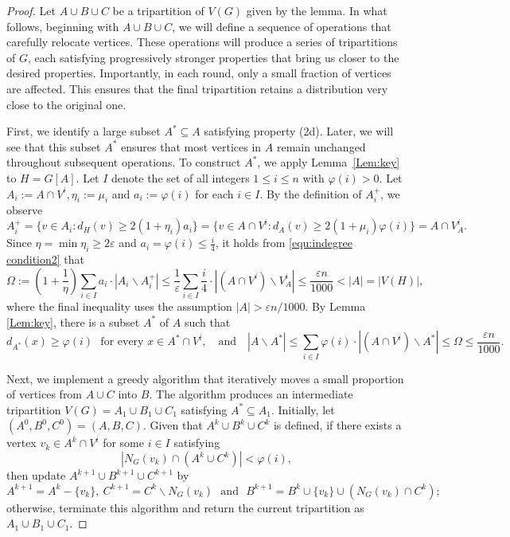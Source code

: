 \documentclass[10pt,a4paper]{amsart}
\begin{document}
	\begin{proof}
		Let $A\cup B\cup C$ be a tripartition of $V(G)$ given by the lemma.
		In what follows, beginning with $A\cup B\cup C$, we will define a sequence of operations that carefully relocate vertices.
		These operations will produce a series of tripartitions of $G$,
		each satisfying progressively stronger properties that bring us closer to the desired properties.
		Importantly, in each round, only a small fraction of vertices are affected.
		This ensures that the final tripartition retains a distribution very close to the original one.
		
		\medskip
		
		First, we identify a large subset $A^* \subseteq A$ satisfying property (2d).
		Later, we will see that this subset $A^*$ ensures that most vertices in $A$ remain unchanged throughout subsequent operations.
		To construct $A^*$, we apply Lemma~\ref{Lem:key} to $H=G[A]$.
		Let $I$ denote the set of all integers $1\leq i\leq n$ with $\varphi(i)>0$.
		Let $A_i:=A\cap V^i, \eta_i:=\mu_i$ and $a_i:=\varphi(i)$ for each $i\in I$.
		By the definition of $A_i^+$,
		we observe $$A_i^+ =\{v \in A_i : d_H(v) \geq 2(1+\eta_i)a_i\}=\{v\in A\cap V^i: d_A(v)\geq 2(1+\mu_i)\varphi(i)\}= A\cap V_A^i.$$
		Since $\eta=\min \eta_i\geq 2\varepsilon$ and $a_i=\varphi(i)\leq \frac{i}{4}$,
		it holds from \eqref{equ:indegree condition2} that
		$$\Omega:=(1+\frac{1}{\eta}) \sum_{i\in I} a_i \cdot|A_i\backslash A^+_i|\leq
		\frac{1}{\varepsilon} \sum_{i\in I} \frac{i}{4}\cdot |(A\cap V^i)\backslash V^i_A|\leq \frac{\varepsilon n}{1000}<|A|=|V(H)|,$$
		where the final inequality uses the assumption $|A|>\varepsilon n/1000$.
		By Lemma \ref{Lem:key}, there is a subset $A^*$ of $A$ such that
		\begin{equation}\label{equ:indeg deg(A*)}
			d_{A^*}(x)\ge \varphi(i) \text{~~for every } x\in A^*\cap V^i,
			\mbox{~~~and~~~}
			|A\backslash A^*|\le \sum_{i\in I} \varphi(i)\cdot |(A\cap V^i)\backslash A^*|\le \Omega\le \frac{\varepsilon n}{1000}.
		\end{equation}
		
		
		\medskip
		
		Next, we implement a greedy algorithm that iteratively moves a small proportion of vertices from $A \cup C$ into $B$.
		The algorithm produces an intermediate tripartition $V(G) = A_1 \cup B_1 \cup C_1$ satisfying $A^* \subseteq A_1$.
		Initially, let $(A^{0}, B^{0}, C^{0}) = (A, B, C)$.
		Given that $A^{k}\cup B^{k}\cup C^{k}$ is defined,
		if there exists a vertex $v_k\in A^{k}\cap V^i$ for some $i\in I$ satisfying
		\begin{equation}
			\label{equ:indeg alg}
			|N_G(v_k)\cap (A^{k}\cup C^{k})|<\varphi(i),
		\end{equation}
		then update $A^{k+1}\cup B^{k+1}\cup C^{k+1}$ by
		$$A^{k+1}=A^k-\{v_k\},~C^{k+1}=C^k\backslash N_G(v_k) \text{~~and~~} B^{k+1}=B^k\cup \{v_k\}\cup (N_G(v_k)\cap C^k);$$
		otherwise, terminate this algorithm and return the current tripartition as $A_1 \cup B_1 \cup C_1$.
		

\end{proof}
\end{document}
